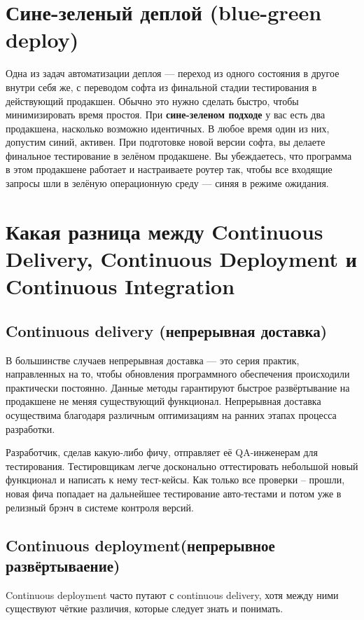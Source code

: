 \section{Сине-зеленый деплой (blue-green deploy)}

Одна из задач автоматизации деплоя — переход из одного состояния в другое внутри себя же, с переводом софта из финальной стадии тестирования в действующий продакшен. Обычно это нужно сделать быстро, чтобы минимизировать время простоя. При \textbf{сине-зеленом подходе} у вас есть два продакшена, насколько возможно идентичных. В любое время один из них, допустим синий, активен. При подготовке новой версии софта, вы делаете финальное тестирование в зелёном продакшене. Вы убеждаетесь, что программа в этом продакшене работает и настраиваете роутер так, чтобы все входящие запросы шли в зелёную операционную среду — синяя в режиме ожидания.

\section{Какая разница между Continuous Delivery, Continuous Deployment и Continuous Integration}

\subsection{Continuous delivery (непрерывная доставка)}

В большинстве случаев непрерывная доставка — это серия практик, направленных на то, чтобы обновления программного обеспечения происходили практически постоянно. Данные методы гарантируют быстрое развёртывание на продакшене не меняя существующий функционал. Непрерывная доставка осуществима благодаря различным оптимизациям на ранних этапах процесса разработки.

Разработчик, сделав какую-либо фичу, отправляет её QA-инженерам для тестирования. Тестировщикам легче досконально оттестировать небольшой новый функционал и написать к нему тест-кейсы. Как только все проверки – прошли, новая фича попадает на дальнейшее тестирование авто-тестами и потом уже в релизный брэнч в системе контроля версий.


\subsection{Continuous deployment(непрерывное развёртываение)}

Continuous deployment часто путают с continuous delivery, хотя между ними существуют чёткие различия, которые следует знать и понимать.


